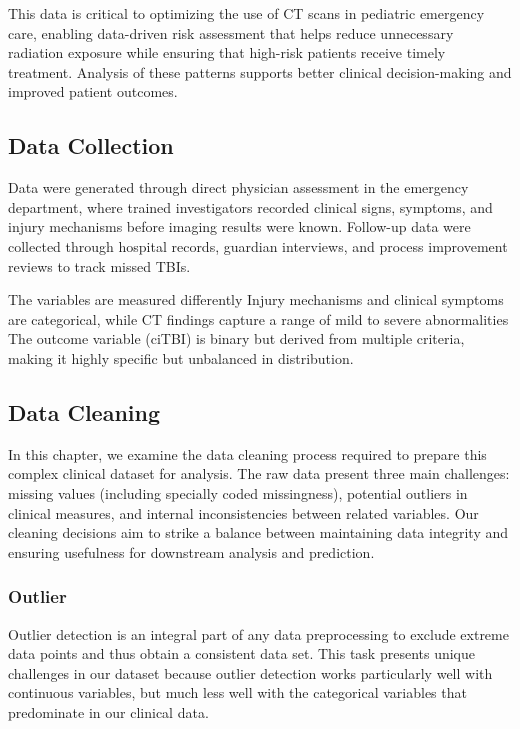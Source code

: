 \documentclass[10pt,letterpaper]{article}
\begin{document}
This data is critical to optimizing the use of CT scans in pediatric emergency care, enabling data-driven risk assessment that helps reduce unnecessary radiation exposure while ensuring that high-risk patients receive timely treatment. Analysis of these patterns supports better clinical decision-making and improved patient outcomes.

\subsection{Data Collection}\label{data-collection}

Data were generated through direct physician assessment in the emergency department, where trained investigators recorded clinical signs, symptoms, and injury mechanisms before imaging results were known. Follow-up data were collected through hospital records, guardian interviews, and process improvement reviews to track missed TBIs.

The variables are measured differently Injury mechanisms and clinical symptoms are categorical, while CT findings capture a range of mild to severe abnormalities The outcome variable (ciTBI) is binary but derived from multiple criteria, making it highly specific but unbalanced in distribution.

\subsection{Data Cleaning}\label{data-cleaning}

In this chapter, we examine the data cleaning process required to prepare this complex clinical dataset for analysis. The raw data present three main challenges: missing values (including specially coded missingness), potential outliers in clinical measures, and internal inconsistencies between related variables. Our cleaning decisions aim to strike a balance between maintaining data integrity and ensuring usefulness for downstream analysis and prediction.

\subsubsection{Outlier}
Outlier detection is an integral part of any data preprocessing to exclude extreme data points and thus obtain a consistent data set. This task presents unique challenges in our dataset because outlier detection works particularly well with continuous variables, but much less well with the categorical variables that predominate in our clinical data.
\end{document}
